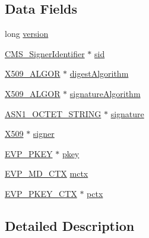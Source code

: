 \subsection*{Data Fields}
\begin{DoxyCompactItemize}
\item 
long \hyperlink{struct_c_m_s___signer_info__st_a17afc5cf84cee4b2123665f28ce85c9f}{version}
\item 
\hyperlink{cms__lcl_8h_ae014235d4e06243d4ec1b9ac00cc0315}{C\+M\+S\+\_\+\+Signer\+Identifier} $\ast$ \hyperlink{struct_c_m_s___signer_info__st_ab707e6b1d5edb20513ee54c6447fd625}{sid}
\item 
\hyperlink{crypto_2ossl__typ_8h_aa2b6185e6254f36f709cd6577fb5022e}{X509\+\_\+\+A\+L\+G\+OR} $\ast$ \hyperlink{struct_c_m_s___signer_info__st_a3db9734e20b06af31aabcfcfc6b62797}{digest\+Algorithm}
\item 
\hyperlink{crypto_2ossl__typ_8h_aa2b6185e6254f36f709cd6577fb5022e}{X509\+\_\+\+A\+L\+G\+OR} $\ast$ \hyperlink{struct_c_m_s___signer_info__st_acedeb2fb063f2ceaf3390ef796c264aa}{signature\+Algorithm}
\item 
\hyperlink{crypto_2ossl__typ_8h_afbd05e94e0f0430a2b729473efec88c1}{A\+S\+N1\+\_\+\+O\+C\+T\+E\+T\+\_\+\+S\+T\+R\+I\+NG} $\ast$ \hyperlink{struct_c_m_s___signer_info__st_ad56114d600ef0d9e92d1253ad8a043d8}{signature}
\item 
\hyperlink{crypto_2ossl__typ_8h_a4f666bde6518f95deb3050c54b408416}{X509} $\ast$ \hyperlink{struct_c_m_s___signer_info__st_a0e99ec2965b5a3ec191a16e28ba90ddc}{signer}
\item 
\hyperlink{crypto_2ossl__typ_8h_a2fca4fef9e4c7a2a739b1ea04acb56ce}{E\+V\+P\+\_\+\+P\+K\+EY} $\ast$ \hyperlink{struct_c_m_s___signer_info__st_a76a3c5d8ec8f468075eb3e366a35a83c}{pkey}
\item 
\hyperlink{crypto_2ossl__typ_8h_a69cda4d21bd068f01c469222c1dd92fe}{E\+V\+P\+\_\+\+M\+D\+\_\+\+C\+TX} \hyperlink{struct_c_m_s___signer_info__st_af2c9a7401ae62fd609fc0ca40fb0db96}{mctx}
\item 
\hyperlink{crypto_2ossl__typ_8h_aaadbb75633e4460a52864970a3b875de}{E\+V\+P\+\_\+\+P\+K\+E\+Y\+\_\+\+C\+TX} $\ast$ \hyperlink{struct_c_m_s___signer_info__st_a948d2b6093ada6d39976bf4970cd2959}{pctx}
\end{DoxyCompactItemize}


\subsection{Detailed Description}


